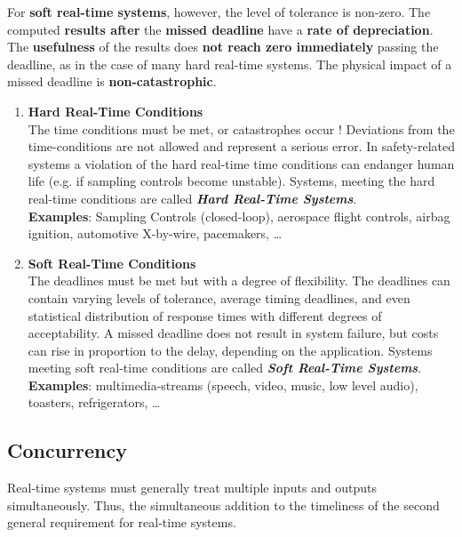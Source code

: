 For \textbf{soft real-time systems}, however, the level of tolerance is non-zero. The computed \textbf{results after} the \textbf{missed deadline} have a \textbf{rate of depreciation}. The \textbf{usefulness} of the results does \textbf{not reach zero immediately} passing the deadline, as in the case of many hard real-time systems. The physical impact of a missed deadline is\textbf{ non-catastrophic}.

\begin{enumerate}
	\item  \textbf{Hard Real-Time Conditions} \\
	The time conditions must be met, or catastrophes occur !  Deviations from the time-conditions are not allowed and represent a serious error. In safety-related systems a violation of the hard real-time time conditions can endanger human life (e.g. if sampling controls become unstable). Systems, meeting the hard real-time conditions are called \textbf{\textit{Hard Real-Time Systems}}.\\
	
\textbf{Examples}: Sampling Controls (closed-loop), aerospace flight controls, airbag ignition, automotive X-by-wire, pacemakers, {\dots} 
	\item  \textbf{Soft Real-Time Conditions} \\
	The deadlines must be met but with a degree of flexibility. The deadlines can contain varying levels of tolerance, average timing deadlines, and even statistical distribution of response times with different degrees of acceptability. A missed deadline does not result in system failure, but costs can rise in proportion to the delay, depending on the application. Systems meeting soft real-time conditions are called \textbf{\textit{Soft Real-Time Systems}}.\\
	
\textbf{Examples}: multimedia-streams (speech, video, music, low level audio), toasters, refrigerators, {\dots} 
\end{enumerate}

\subsection{Concurrency}

Real-time systems must generally treat multiple inputs and outputs simultaneously. Thus, the simultaneous addition to the timeliness of the second general requirement for real-time systems.\\

